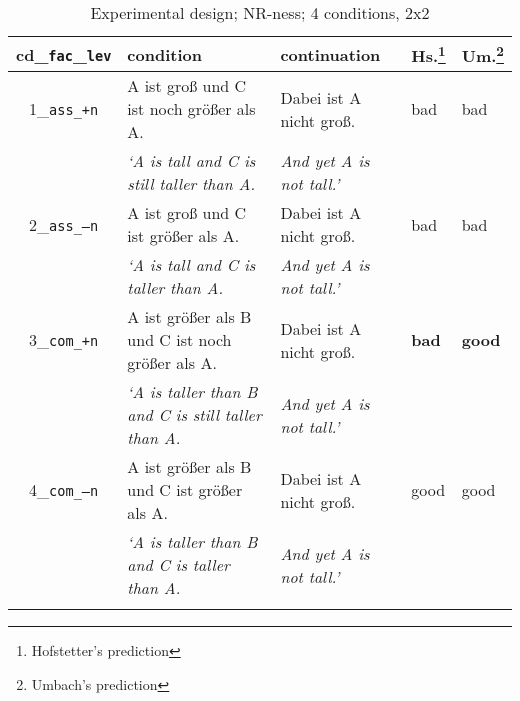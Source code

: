 \documentclass[output=paper,
modfonts
]{langscibook}
\begin{document}
\begin{table}[H]\scriptsize
\begin{tabular}{cll|l|l}
\lsptoprule
cd\_\texttt{fac}\_\texttt{lev} & condition & continuation & Hs.\footnote{ Hofstetter's prediction} & Um.\footnote{ Umbach's prediction} \\
\midrule \midrule 
1\_\texttt{ass\_\footnotesize{+}n} & A ist groß \hspace{25pt} und C ist noch größer als A. & Dabei ist A nicht groß. & bad &  bad \\
 & \textit{`A is tall \hspace{32pt} and C is \hspace{0.4pt} still \hspace{2pt} taller than A.} & \textit{And yet A is not tall.'} & & \\
\midrule
2\_\texttt{ass\_\footnotesize{--}n} & A ist groß \hspace{25pt} und C ist \hspace{16pt} größer als A. & Dabei ist A nicht groß. & bad & bad \\
 & \textit{`A is tall \hspace{32pt} and C is \hspace{19pt} taller than A.} & \textit{And yet A is not tall.'} & & \\
\midrule 
3\_\texttt{com\_\footnotesize{+}n} & A ist größer als B \hspace{0.65pt} und C ist noch größer als A. & Dabei ist A nicht groß. & \textbf{bad} & \textbf{good} \\
 & \textit{`A is taller than B \hspace{2pt} and C is \hspace{0.4pt} still \hspace{2pt} taller than A.} & \textit{And yet A is not tall.'} & & \\
\midrule
4\_\texttt{com\_\footnotesize{--}n} & A ist größer als B \hspace{0.65pt} und C ist \hspace{16pt} größer als A. & Dabei ist A nicht groß. & good & good \\
 & \textit{`A is taller than B \hspace{2pt} and C is \hspace{19pt} taller than A.} & \textit{And yet A is not tall.'} & & \\
\lspbottomrule
\end{tabular}
\caption{Experimental design; NR-ness; 4 conditions, 2x2}
\label{tab:4_conds_material}
\end{table}
\end{document}
